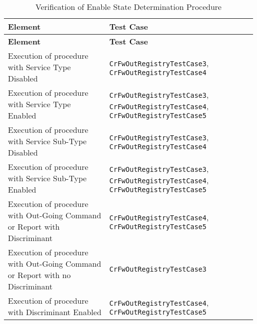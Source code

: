 \documentclass{pnp_article}
\begin{document}
\begin{longtable}{|>{\raggedright}p{8.0cm}|P{5.0cm}|}
\caption{Verification of Enable State Determination Procedure}
\label{tab:verEnableStateDeterminationProc}\\
\hline
{}
\textbf{Element} & \textbf{Test Case} \\
\hline
\endfirsthead
{}
\textbf{Element} & \textbf{Test Case} \\
\hline
\endhead
Execution of procedure with Service Type Disabled & \texttt{CrFwOutRegistryTestCase3}, \texttt{CrFwOutRegistryTestCase4}\\
\hline
Execution of procedure with Service Type Enabled & \texttt{CrFwOutRegistryTestCase3}, \texttt{CrFwOutRegistryTestCase4}, \texttt{CrFwOutRegistryTestCase5}\\
\hline
Execution of procedure with Service Sub-Type Disabled & \texttt{CrFwOutRegistryTestCase3}, \texttt{CrFwOutRegistryTestCase4}\\
\hline
Execution of procedure with Service Sub-Type Enabled & \texttt{CrFwOutRegistryTestCase3}, \texttt{CrFwOutRegistryTestCase4}, \texttt{CrFwOutRegistryTestCase5}\\
\hline
Execution of procedure with Out-Going Command or Report with Discriminant & \texttt{CrFwOutRegistryTestCase4}, \texttt{CrFwOutRegistryTestCase5}\\
\hline
Execution of procedure with Out-Going Command or Report with no Discriminant & \texttt{CrFwOutRegistryTestCase3}\\
\hline
Execution of procedure with Discriminant Enabled & \texttt{CrFwOutRegistryTestCase4}, \texttt{CrFwOutRegistryTestCase5}\\
\hline
\end{longtable}
\end{document}
